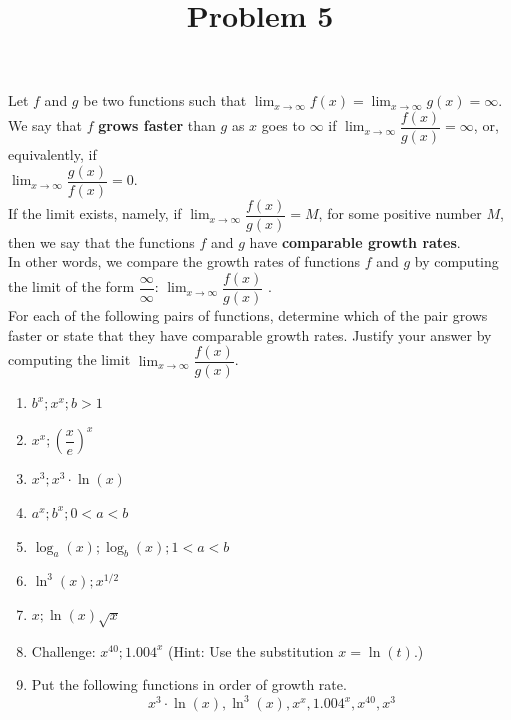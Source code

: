 \documentclass{ximera}
\title[Problem 5]{Problem 5}
\begin{document}
\begin{abstract} \end{abstract}
\maketitle

\begin{problem}
Let $f$ and $g$ be two functions such that $\displaystyle \lim_{x\to\infty}f(x)=\displaystyle \lim_{x\to\infty}g(x)=\infty$.\\[1em]

We say that $f$   \textbf{grows faster} than $g$ as $x$ goes to $\infty$  if  $\displaystyle \lim_{x\to\infty}\dfrac{f(x)}{g(x)}=\infty$, or, equivalently, if\\

 $\displaystyle \lim_{x\to\infty}\dfrac{g(x)}{f(x)}=0$.\\

If the limit exists, namely, if  $\displaystyle \lim_{x\to\infty}\dfrac{f(x)}{g(x)}=M$, for some positive number $M$,\\

 then we say that the functions $f$ and $g$ have \textbf{comparable growth rates}.\\

In other words, we compare the growth rates of  functions $f$ and $g$ by computing the limit of the form $\dfrac{\infty}{\infty}$: $\displaystyle \lim_{x\to\infty}\dfrac{f(x)}{g(x)}$ .\\

For each of the following pairs of functions, determine which of the pair grows faster or state that they have comparable growth rates.  Justify your answer by computing the limit $\displaystyle \lim_{x\to\infty}\dfrac{f(x)}{g(x)}$.

\begin{enumerate}
	\item$b^x; x^x; b>1$\\
	\item $x^x; \left(\dfrac{x}{e}\right)^x$\\
	\item $x^3;  x^3 \cdot \ln(x)$\\
	\item $a^x; b^x; 0<a<b$\\
	\item $\log_a(x); \log_b(x); 1<a<b$\\
	\item $\ln^{3} (x); x^{1/2}$\\
	\item $x; \ln(x)\sqrt{x}$\\
	\item Challenge: $x^{40}; 1.004^x$ (Hint: Use the substitution $x=\ln(t)$.)\\
	
	\item Put the following functions in order of growth rate.\\
	\[x^3 \cdot \ln(x), \ln^{3} (x), x^x, 1.004^x, x^{40}, x^3\] 
	
	\end{enumerate}
\end{problem}
\end{document}
